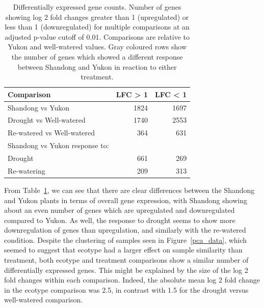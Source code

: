 \documentclass[12pt]{article}
\begin{document}
	\begin{table}[H]
		\centering
		\begin{tabular}{lrr}
			\toprule
			Comparison & LFC > 1 & LFC < 1 \\
			\midrule
			Shandong vs Yukon & 1824 & 1697 \\
			Drought vs Well-watered & 1740  & 2553 \\
			Re-watered vs Well-watered & 364 & 631 \\
			\rowcolor{Gray}
			Shandong vs Yukon response to: && \\
			\rowcolor{Gray}
			Drought & 661 & 269 \\
			\rowcolor{Gray}
			Re-watering & 209 & 313 \\
			\bottomrule
		\end{tabular}
		\caption[Differentially expressed gene counts]{Differentially expressed gene counts. Number of genes showing log 2 fold changes greater than 1 (upregulated) or less than 1 (downregulated) for multiple comparisons at an adjusted p-value cutoff of 0.01. Comparisons are relative to Yukon and well-watered values. Gray coloured rows show the number of genes which showed a different response between Shandong and Yukon in reaction to either treatment.}
		\label{lfcs}
	\end{table}
	
	From Table~\ref{lfcs}, we can see that there are clear differences between the Shandong and Yukon plants in terms of overall gene expression, with Shandong showing about an even number of genes which are upregulated and downregulated compared to Yukon. As well, the response to drought seems to show more downregulation of genes than upregulation, and similarly with the re-watered condition. Despite the clustering of samples seen in Figure~\ref{pca_data}, which seemed to suggest that ecotype had a larger effect on sample similarity than treatment, both ecotype and treatment comparisons show a similar number of differentially expressed genes. This might be explained by the size of the log 2 fold changes within each comparison. Indeed, the absolute mean log 2 fold change in the ecotype comparison was 2.5, in contrast with 1.5	for the drought versus well-watered comparison.
	
\end{document}
